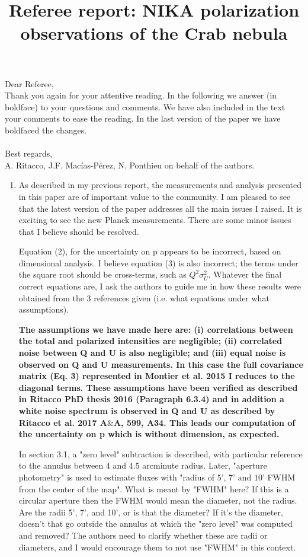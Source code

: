 \documentclass[12pt]{article}
\title{Referee report: NIKA polarization observations of the Crab nebula}
\begin{document}
\maketitle

\noindent Dear Referee,\\
Thank you again for your attentive reading. 
In the following we answer (in boldface) to your questions and comments. 
We have also included in the text your comments to ease the reading.
In the last version of the paper we have boldfaced the changes. \\  \\
Best regards,\\
A. Ritacco, J.F. Macías-Pérez, N. Ponthieu on behalf of the authors.


\begin{enumerate}
    \item 
{
As described in my previous report, the measurements and analysis 
presented in this paper are of important value to the community. I am 
pleased to see that the latest version of the paper addresses all the 
main issues I raised. It is exciting to see the new Planck 
measurements. There are some minor issues that I believe 
should be resolved. 
}

Equation (2), for the uncertainty on p appears to be incorrect, based 
on dimensional analysis. I believe equation (3) is also incorrect; 
the terms under the square root should be cross-terms, such as 
$Q^2\sigma_U^2$. Whatever the final correct equations are, I ask the 
authors to guide me in how these results were obtained from the 3 
references given (i.e. what equations under what assumptions).

{\bf The assumptions we have made here are: (i) correlations between the total and polarized intensities are negligible; (ii) correlated noise between Q and U is also negligible; and (iii) equal noise is observed on Q and U measurements.
  In this case the full covariance matrix (Eq. 3) represented in Montier et al. 2015 I reduces to the diagonal terms. These assumptions have been verified as described in Ritacco PhD thesis 2016 (Paragraph 6.3.4) and in addition a white noise spectrum is observed in Q and U as described by Ritacco et al. 2017 A$\&$A, 599, A34. This leads our computation of the uncertainty on p which is without dimension, as expected.}

In section 3.1, a "zero level" subtraction is described, with 
particular reference to the annulus between 4 and 4.5 arcminute 
radius. Later, "aperture photometry" is used to estimate fluxes with 
"radius of 5', 7' and 10' FWHM from the center of the map". What is 
meant by "FWHM" here? If this is a circular aperture then the FWHM 
would mean the diameter, not the radius. Are the radii 5', 7', and 
10', or is that the diameter? If it's the diameter, doesn't that go 
outside the annulus at which the "zero level" was computed and 
removed? The authors need to clarify whether these are radii or 
diameters, and I would encourage them to not use "FWHM" in this 
context. 


\end{enumerate}
\end{document}
